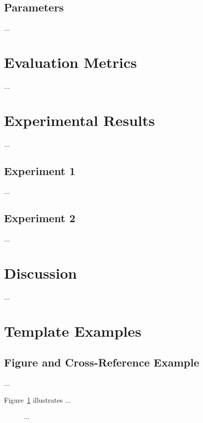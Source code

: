 \subsection{Parameters}
...

\section{Evaluation Metrics}
...

\section{Experimental Results}
...

\subsection{Experiment 1}
...

\subsection{Experiment 2}
...

\section{Discussion}
...

\section{Template Examples}
\label{sec:template-ch4-simulation-validation}

\subsection{Figure and Cross-Reference Example}
...

Figure~\ref{fig:template-ch4-simulation-validation} illustrates ...
\begin{figure}[htbp]
    \centering
    \caption{...}
    \label{fig:template-ch4-simulation-validation}
\end{figure}

